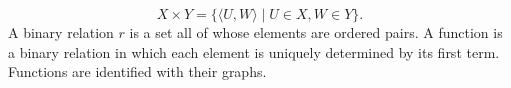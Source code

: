 $$X \times Y = \{ \langle U, W \rangle \mid U \in X, W \in Y \}.$$
A binary relation $r$ is a set all of whose elements are ordered pairs. A function is a binary relation in which each element is uniquely determined by its first term. Functions are identified with their graphs.
